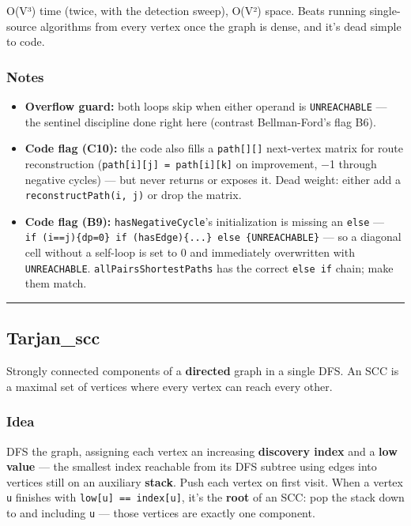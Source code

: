 \documentclass[
  10pt,
  letterpaper,
  onecolumn]{article}
\providecommand{\tightlist}{%
  \setlength{\itemsep}{0pt}\setlength{\parskip}{0pt}}
\begin{document}
O(V³) time (twice, with the detection sweep), O(V²) space. Beats running
single-source algorithms from every vertex once the graph is dense, and
it's dead simple to code.

\hypertarget{notes-18}{%
\subsubsection{Notes}\label{notes-18}}

\begin{itemize}
\tightlist
\item
  \textbf{Overflow guard:} both loops skip when either operand is
  \texttt{UNREACHABLE} --- the sentinel discipline done right here
  (contrast Bellman-Ford's flag B6).
\item
  \textbf{Code flag (C10):} the code also fills a
  \texttt{path{[}{]}{[}{]}} next-vertex matrix for route reconstruction
  (\texttt{path{[}i{]}{[}j{]}\ =\ path{[}i{]}{[}k{]}} on improvement, −1
  through negative cycles) --- but never returns or exposes it. Dead
  weight: either add a \texttt{reconstructPath(i,\ j)} or drop the
  matrix.
\item
  \textbf{Code flag (B9):} \texttt{hasNegativeCycle}'s initialization is
  missing an \texttt{else} ---
  \texttt{if\ (i==j)\{dp=0\}\ if\ (hasEdge)\{...\}\ else\ \{UNREACHABLE\}}
  --- so a diagonal cell without a self-loop is set to 0 and immediately
  overwritten with \texttt{UNREACHABLE}. \texttt{allPairsShortestPaths}
  has the correct \texttt{else\ if} chain; make them match.
\end{itemize}

\begin{center}\rule{0.5\linewidth}{0.5pt}\end{center}

\hypertarget{tarjan_scc}{%
\subsection{Tarjan\_scc}\label{tarjan_scc}}

Strongly connected components of a \textbf{directed} graph in a single
DFS. An SCC is a maximal set of vertices where every vertex can reach
every other.

\hypertarget{idea-20}{%
\subsubsection{Idea}\label{idea-20}}

DFS the graph, assigning each vertex an increasing \textbf{discovery
index} and a \textbf{low value} --- the smallest index reachable from
its DFS subtree using edges into vertices still on an auxiliary
\textbf{stack}. Push each vertex on first visit. When a vertex
\texttt{u} finishes with \texttt{low{[}u{]}\ ==\ index{[}u{]}}, it's the
\textbf{root} of an SCC: pop the stack down to and including \texttt{u}
--- those vertices are exactly one component.
\end{document}
